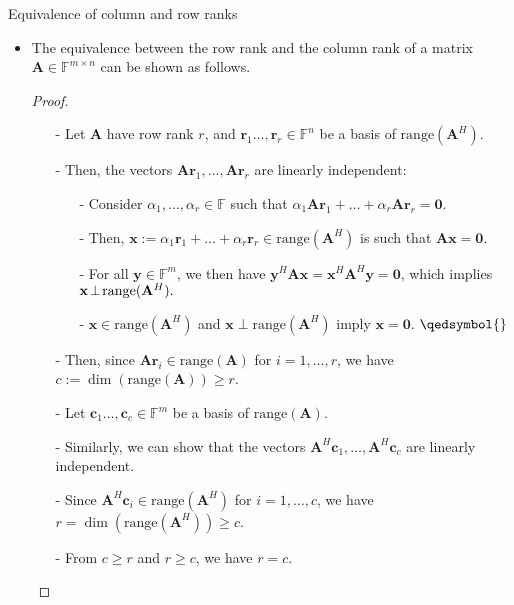 \documentclass[t,usepdftitle=false]{beamer}
\begin{document}
\begin{frame}{Equivalence of column and row ranks}
\begin{itemize}
\item The equivalence between the row rank and the column rank of a matrix $\mathbf{A}\in\mathbb{F}^{m\times n}$ can be shown as follows.
\begin{proof}
\begin{itemize}
\item[-] Let $\mathbf{A}$ have row rank $r$, and $\mathbf{r}_1\dots,\mathbf{r}_r\in\mathbb{F}^n$ be a basis of $\mathrm{range}(\mathbf{A}^H)$.\vspace{-.05cm}
\item[-] Then, the vectors $\mathbf{A}\mathbf{r}_1,\dots,\mathbf{A}\mathbf{r}_r$ are linearly independent:\vspace{-.14cm}
\begin{itemize}
\item[-] Consider $\alpha_1,\dots,\alpha_r\in\mathbb{F}$ such that $\alpha_1\mathbf{A}\mathbf{r}_1+\dots+\alpha_r\mathbf{A}\mathbf{r}_r=\mathbf{0}$.\vspace{.1cm}
\item[-] Then, $\mathbf{x}:=\alpha_1\mathbf{r}_1+\dots+\alpha_r\mathbf{r}_r\in\mathrm{range}(\mathbf{A}^H)$ is such that $\mathbf{A}\mathbf{x}=\mathbf{0}$.\vspace{.1cm}
\item[-] For all $\mathbf{y}\in\mathbb{F}^{m}$, we then have $\mathbf{y}^H\mathbf{A}\mathbf{x}=\mathbf{x}^H\mathbf{A}^H\mathbf{y}=\mathbf{0}$, which implies $\mathbf{x}\!\perp\!\mathrm{range}(\mathbf{A}^H).\hspace{-1cm}$\vspace{.1cm}
\item[-] $\mathbf{x}\in\mathrm{range}(\mathbf{A}^H)$ and $\mathbf{x}\perp\mathrm{range}(\mathbf{A}^H)$ imply $\mathbf{x}=\mathbf{0}$. $\qedsymbol{}$\vspace{-.1cm}
\end{itemize}
\item[-] Then, since $\mathbf{A}\mathbf{r}_i\in\mathrm{range}(\mathbf{A})$ for $i=1,\dots,r$, we have $c:=\dim(\mathrm{range}(\mathbf{A}))\geq r$.\vspace{-.05cm}
\item[-] Let $\mathbf{c}_1\dots,\mathbf{c}_c\in\mathbb{F}^m$ be a basis of $\mathrm{range}(\mathbf{A})$.\vspace{-.05cm}
\item[-] Similarly, we can show that the vectors $\mathbf{A}^H\mathbf{c}_1,\dots,\mathbf{A}^H\mathbf{c}_c$ are linearly independent.\vspace{-.05cm}
\item[-] Since $\mathbf{A}^H\mathbf{c}_i\in\mathrm{range}(\mathbf{A}^H)$ for $i=1,\dots,c$, we have $r=\dim(\mathrm{range}(\mathbf{A}^H))\geq c$.\vspace{-.05cm}
\item[-] From $c\geq r$ and $r\geq c$, we have $r=c$.\vspace{-.5cm}
\end{itemize}
\end{proof}
\end{itemize}
\end{frame}
\end{document}
